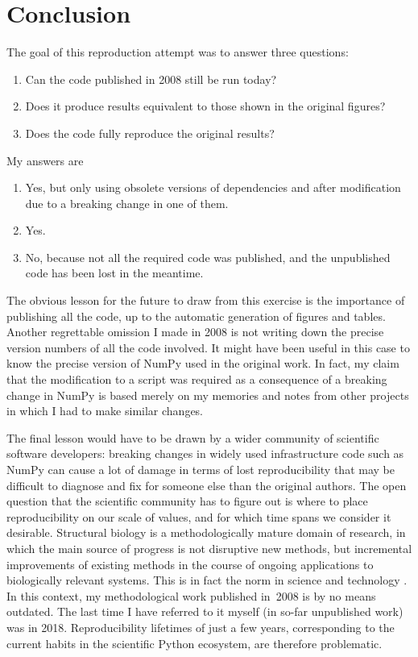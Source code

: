 \section*{Conclusion}

The goal of this reproduction attempt was to answer three questions:
\begin{enumerate}
\item Can the code published in 2008 still be run today?
\item Does it produce results equivalent to those shown in the original figures?
\item Does the code fully reproduce the original results?
\end{enumerate}

My answers are
\begin{enumerate}
\item Yes, but only using obsolete versions of dependencies and after modification due to a breaking change in one of them.
\item Yes.
\item No, because not all the required code was published, and the unpublished code has been lost in the meantime.
\end{enumerate}

The obvious lesson for the future to draw from this exercise is the importance of publishing all the code, up to the automatic generation of figures and tables. Another regrettable omission I made in 2008 is not writing down the precise version numbers of all the code involved. It might have been useful in this case to know the precise version of NumPy used in the original work. In fact, my claim that the modification to a script was required as a consequence of a breaking change in NumPy is based merely on my memories and notes from other projects in which I had to make similar changes.

The final lesson would have to be drawn by a wider community of scientific software developers: breaking changes in widely used infrastructure code such as NumPy can cause a lot of damage in terms of lost reproducibility that may be difficult to diagnose and fix for someone else than the original authors. The open question that the scientific community has to figure out is where to place reproducibility on our scale of values, and for which time spans we consider it desirable. Structural biology is a methodologically mature domain of research, in which the main source of progress is not disruptive new methods, but incremental improvements of existing methods in the course of ongoing applications to biologically relevant systems. This is in fact the norm in science and technology \cite{Arthurnaturetechnologywhat2009}. In this context, my methodological work published in~2008 is by no means outdated. The last time I have referred to it myself (in so-far unpublished work) was in 2018. Reproducibility lifetimes of just a few years, corresponding to the current habits in the scientific Python ecosystem, are therefore problematic.

